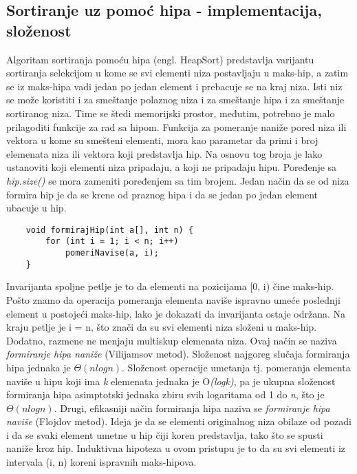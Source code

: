 \documentclass{article}
\begin{document}
\subsection{Sortiranje uz pomoć hipa - implementacija, složenost}
Algoritam sortiranja pomoću hipa (engl. HeapSort)
predstavlja varijantu sortiranja selekcijom u kome se svi elementi niza postavljaju
u maks-hip, a zatim se iz maks-hipa vadi jedan po jedan element i prebacuje
se na kraj niza. Isti niz se može koristiti i za smeštanje
polaznog niza i za smeštanje hipa i za smeštanje sortiranog niza. Time se štedi memorijski prostor, međutim, potrebno je malo prilagoditi
funkcije za rad sa hipom. Funkcija za pomeranje naniže pored niza
ili vektora u kome su smešteni elementi, mora kao parametar da primi i broj
elemenata niza ili vektora koji predstavlja hip.
Na osnovu tog broja je lako ustanoviti koji elementi niza pripadaju, a koji ne
pripadaju hipu. Poređenje sa \textit{hip.size()} se mora zameniti poređenjem sa tim
brojem.
\newline Jedan način da se od niza formira hip je da se
krene od praznog hipa i da se jedan po jedan element ubacuje u hip.
\begin{lstlisting}
    void formirajHip(int a[], int n) {
        for (int i = 1; i < n; i++)
            pomeriNavise(a, i);
    }
\end{lstlisting}
Invarijanta spoljne petlje je to da elementi na pozicijama
[0, i) čine maks-hip. Pošto znamo da operacija pomeranja elementa naviše
ispravno umeće poslednji element u postojeći maks-hip, lako je dokazati da
invarijanta ostaje održana. Na kraju petlje je i = n, što znači da su svi elementi niza složeni u maks-hip. Dodatno, razmene ne
menjaju multiskup elemenata niza.
Ovaj način se naziva \textit{formiranje hipa naniže} (Vilijamsov metod). Složenost
najgoreg slučaja formiranja hipa jednaka je $\Theta(nlogn)$. Složenost operacije
umetanja tj. pomeranja elementa naviše u hipu koji ima \textit{k} elemenata jednaka je
O\textit{(logk)}, pa je ukupna složenost formiranja hipa asimptotski jednaka zbiru svih
logaritama od 1 do \textit{n}, što je $\Theta(nlogn)$.
\newline Drugi, efikasniji način formiranja hipa naziva se \textit{formiranje hipa naviše} (Flojdov
metod). Ideja je da se elementi originalnog niza obilaze od pozadi i da se svaki
element umetne u hip čiji koren predstavlja, tako što se spusti naniže kroz hip.
Induktivna hipoteza u ovom pristupu je to da su svi elementi iz intervala (i, n)
koreni ispravnih maks-hipova.
\newline
\end{document}
